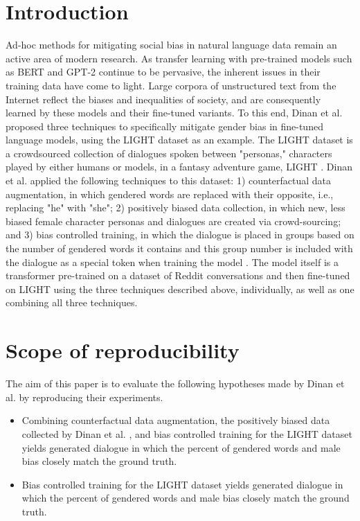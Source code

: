 \section{Introduction}
Ad-hoc methods for mitigating social bias in natural language data remain an active area of modern research. As transfer learning with pre-trained models such as BERT \supercite{devlin-etal-2019-bert} and GPT-2 \supercite{gpt2} continue to be pervasive, the inherent issues in their training data have come to light. Large corpora of unstructured text from the Internet reflect the biases and inequalities of society, and are consequently learned by these models and their fine-tuned variants. To this end, Dinan et al. \supercite{dinan2020} proposed three techniques to specifically mitigate gender bias in fine-tuned language models, using the LIGHT dataset \supercite{urbanek2019} as an example. The LIGHT dataset is a crowdsourced collection of dialogues spoken between "personas," characters played by either humans or models, in a fantasy adventure game, LIGHT \supercite{urbanek2019}. Dinan et al. applied the following techniques to this dataset: 1) counterfactual data augmentation, in which gendered words are replaced with their opposite, i.e., replacing "he" with "she"; 2) positively biased data collection, in which new, less biased female character personas and dialogues are created via crowd-sourcing; and 3) bias controlled training, in which the dialogue is placed in groups based on the number of gendered words it contains and this group number is included with the dialogue as a special token when training the model \supercite{dinan2020}. The model itself is a transformer pre-trained on a dataset of Reddit conversations \supercite{redditmodel} and then fine-tuned on LIGHT using the three techniques described above, individually, as well as one combining all three techniques.

\section{Scope of reproducibility}
\label{sec:claims}

The aim of this paper is to evaluate the following hypotheses made by Dinan et al. \supercite{dinan2020} by reproducing their experiments.
\begin{itemize}
    \item Combining counterfactual data augmentation, the positively biased data collected by Dinan et al. \supercite{dinan2020}, and bias controlled training for the LIGHT dataset yields generated dialogue in which the percent of gendered words and male bias closely match the ground truth.
    \item Bias controlled training for the LIGHT dataset yields generated dialogue in which the percent of gendered words and male bias closely match the ground truth.
\end{itemize}

